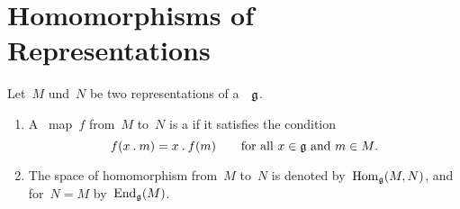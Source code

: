 \section{Homomorphisms of Representations}


\begin{definition}
	Let~$M$ und~$N$ be two representations of a~{\liealgebra{$\kf$}}~$\mathfrak{g}$.
	\begin{enumerate}
		\item
			A~{\linear{$\kf$}} map~$f$ from~$M$ to~$N$ is a  if it satisfies the condition
			\[
				f(x \mathbin{.} m) = x \mathbin{.} f(m)
				\qquad
				\text{for all~$x \in \mathfrak{g}$ and~$m \in M$.}
			\]
		\item
			The space of homomorphism from~$M$ to~$N$ is denoted by~$\operatorname{Hom}_{\mathfrak{g}}(M,N)$, and for~$N = M$ by~$\operatorname{End}_{\mathfrak{g}}(M)$.
	\end{enumerate}
\end{definition}


